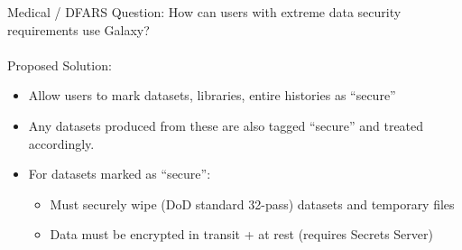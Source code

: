 \documentclass[12pt]{ufrslides}
\begin{document}
	\begin{frame}{Medical / DFARS}
		Question: How can users with extreme data security requirements use Galaxy?\\ \ \\
		Proposed Solution:
		\begin{itemize}
			\item Allow users to mark datasets, libraries, entire histories as ``secure''
			\item Any datasets produced from these are also tagged ``secure'' and treated accordingly.
			\item For datasets marked as ``secure'':
				\begin{itemize}
					\item Must securely wipe (DoD standard 32-pass) datasets and temporary files
					\item Data must be encrypted in transit + at rest (requires Secrets Server)
				\end{itemize}
		\end{itemize}
	\end{frame}
\end{document}
